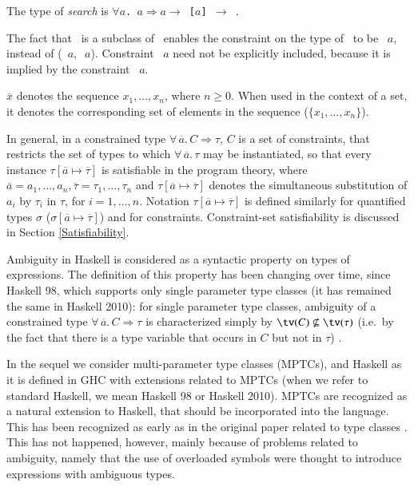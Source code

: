 \documentclass[review]{elsarticle}
\begin{document}
The type of {\it search\/} is {\tt $\forall a$.\!\Ord\ $\!a\!\Rightarrow\! a\!\!\rightarrow\!\!$ [$a$] $\!\!\rightarrow\!\!$ \Bool}. 

The fact that \Eq\ is a subclass of \Ord\ enables the constraint on
the type of \search\ to be \Ord\ $a$, instead of
(\Ord\ $a$,$\:$\Eq\ $a$). Constraint \Eq\ $a$ need not be explicitly
included, because it is implied by the constraint \Ord\ $a$.

$\overline{x}$ denotes the sequence $x_1,\ldots,x_n$, where $n\geq 0$.
When used in the context of a set, it denotes the corresponding set of
elements in the sequence ($\{ x_1,\ldots,x_n\}$).

In general, in a constrained type
$\forall\,\overline{a}.\,C\!\Rightarrow\!\tau$, $C$ is a set of
constraints, that restricts the set of types to which
$\forall\,\overline{a}.\,\tau$ may be instantiated, so that every
instance $\tau [\overline{a} \mapsto \overline{\tau}]$ is satisfiable
in the program theory, where $\overline{a} = a_1,\ldots,a_n,
\overline{\tau} = \tau_1, \ldots, \tau_n$ and $\tau [\overline{a}
  \mapsto \overline{\tau}]$ denotes the simultaneous substitution of
$a_i$ by $\tau_i$ in $\tau$, for $i=1,\ldots,n$. Notation
$\tau[\overline{a} \mapsto \overline{\tau}]$ is defined similarly for
quantified types $\sigma$ ($\sigma[\overline{a} \mapsto
  \overline{\tau}]$) and for constraints.  Constraint-set
satisfiability is discussed in Section \ref{Satisfiability}.

Ambiguity in Haskell is considered as a syntactic property on types of
expressions. The definition of this property has been changing over
time, since Haskell 98, which supports only single parameter type
classes (it has remained the same in Haskell 2010): for single
parameter type classes, ambiguity of a constrained type
$\forall\,\overline{a}.\,C\!\Rightarrow\! \tau$ is characterized
simply by $\tv(C)\not\subseteq \tv(\tau)$ (i.e.~by the fact that there
is a type variable that occurs in $C$ but not in $\tau$)
\cite{MarkJones94a,Hall96}.

In the sequel we consider multi-parameter type classes (MPTCs), and
Haskell as it is defined in GHC \cite{ghc} with extensions related to
MPTCs (when we refer to standard Haskell, we mean Haskell 98 or
Haskell 2010). MPTCs are recognized as a natural extension to Haskell,
that should be incorporated into the language. This has been
recognized as early as in the original paper related to type classes
\cite{Wadler-Blott89}. This has not happened, however, mainly because
of problems related to ambiguity, namely that the use of overloaded
symbols were thought to introduce expressions with ambiguous
types.
\end{document}
